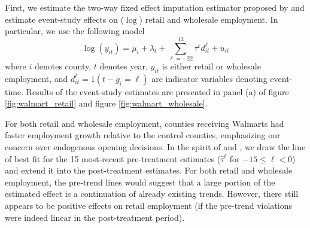 First, we estimate the two-way fixed effect imputation estimator proposed by \citet{Borusyak_Jaravel_Spiess_2021} and estimate event-study effects on ($\log$) retail and wholesale employment. In particular, we use the following model
\begin{equation}\label{eq:Walmart_twfe}
  \log(y_{it}) = \mu_i + \lambda_t + \sum_{\ell=-22}^{13} \tau^\ell d_{it}^\ell + u_{it}
\end{equation}
where $i$ denotes county, $t$ denotes year, $y_{it}$ is either retail or wholesale employment, and $d_{it}^\ell = 1(t - g_i = \ell)$ are indicator variables denoting event-time. Results of the event-study estimates are presented in panel (a) of figure \ref{fig:walmart_retail} and figure \ref{fig:walmart_wholesale}.

For both retail and wholesale employment, counties receiving Walmarts had faster employment growth relative to the control counties, emphasizing our concern over endogenous opening decisions. In the spirit of \citet{Freyaldenhoven_Hansen_Perez_Shapiro_2022} and \citet{rambachan2023more}, we draw the line of best fit for the 15 most-recent pre-treatment estimates ($\hat{\tau}^\ell$ for $-15 \leq \ell < 0$) and extend it into the post-treatment estimates. For both retail and wholesale employment, the pre-trend lines would suggest that a large portion of the estimated effect is a continuation of already existing trends. However, there still appears to be positive effects on retail employment (if the pre-trend violations were indeed linear in the post-treatment period). 


